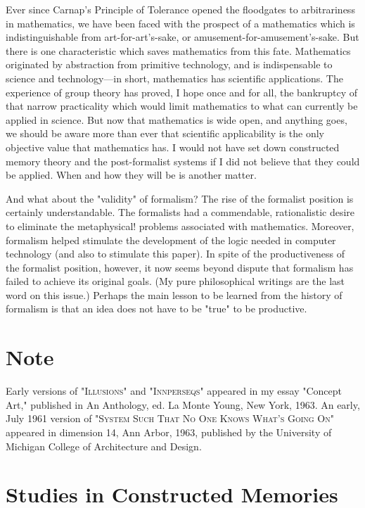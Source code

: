 \documentclass[10pt,twoside,draft]{memoir}
\begin{document}
{Ever since Carnap's Principle of Tolerance opened the floodgates to 
arbitrariness in mathematics, we have been faced with the prospect of a 
mathematics which is  indistinguishable from  art-for-art's-sake, or 
amusement-for-amusement's-sake. But there is one characteristic which saves 
mathematics from this fate. Mathematics originated by abstraction from 
primitive technology, and is indispensable to science and technology---in 
short, mathematics has scientific applications. The experience of group 
theory has proved, I hope once and for all, the bankruptcy of that narrow 
practicality which would limit mathematics to what can currently be applied 
in science. But now that mathematics is wide open, and anything goes, we 
should be aware more than ever that scientific applicability is the only 
objective value that mathematics has. I would not have set down constructed 
memory theory and the post-formalist systems if I did not believe that they 
could be applied. When and how they will be is another matter. 

And what about the "validity" of formalism? The rise of the formalist 
position is certainly understandable. The formalists had a commendable, 
rationalistic desire to eliminate the metaphysical! problems associated with 
mathematics. Moreover, formalism helped stimulate the development of the 
logic needed in computer technology (and also to stimulate this paper). In 
spite of the productiveness of the formalist position, however, it now seems 
beyond dispute that formalism has failed to achieve its original goals. (My 
pure philosophical writings are the last word on this issue.) Perhaps the main 
lesson to be learned from the history of formalism is that an idea does not 
have to be "true" to be productive. 


\section{Note}
Early versions of \textsc{"Illusions"} and \textsc{"Innperseqs"} appeared in my essay 
"Concept Art," published in An Anthology, ed. La Monte Young, New 
York, 1963. An early, July 1961 version of \textsc{"System Such That No One 
Knows What's Going On"} appeared in dimension 14, Ann Arbor, 1963, 
published by the University of Michigan College of Architecture and Design. 

\section{Studies in Constructed Memories}

}
\end{document}
